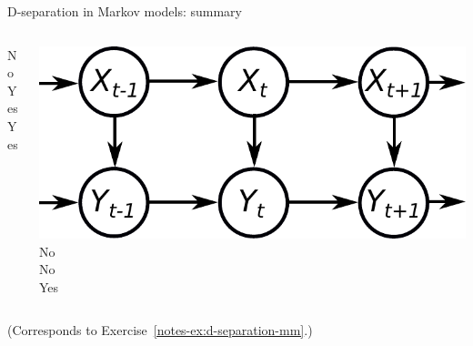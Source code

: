\documentclass{beamer}
\begin{document}
\begin{frame}{D-separation in Markov models: summary}
\begin{columns}
\begin{column}{0.25\textwidth}
  No\vspace{.5cm}\\
  Yes\vspace{.5cm}\\
  Yes
 \end{column}\hspace{3mm}
  \begin{column}{0.25\textwidth}
 \centering
  \includegraphics[width=\textwidth]{fig/temporal-ohmm.pdf}\vspace{3mm}\\
  No\vspace{.5cm}\\
  No\vspace{.5cm}\\
  Yes
 \end{column}
\end{columns}\vspace{8mm}
(\small Corresponds to Exercise~\ref{notes-ex:d-separation-mm}.)
\end{frame}

% 

\end{document}
